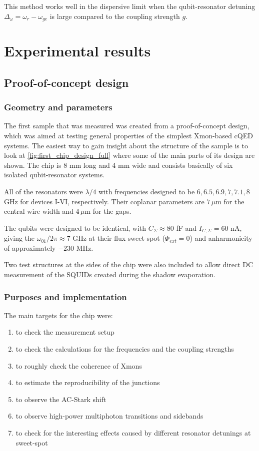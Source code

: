 \documentclass[12pt, twoside]{report}
\numberwithin{equation}{section}
\begin{document}
This method works well in the dispersive limit when the qubit-resonator detuning $\Delta_\omega = \omega_r - \omega_{ge}$ is large compared to the coupling strength $g$.

\chapter{Experimental results}

\section{Proof-of-concept design}

\subsection{Geometry and parameters}

The first sample that was measured was created from a proof-of-concept design, which was aimed at testing general properties of the simplest Xmon-based cQED systems. The easiest way to gain insight about the structure of the sample is to look at \autoref{fig:first_chip_design_full} where some of the main parts of its design are shown. The chip is 8 mm long and 4 mm wide and consists basically of six isolated qubit-resonator systems. 

All of the resonators were $\lambda/4$ with frequencies designed to be $6, 6.5, 6.9,7,7.1,8$ GHz for devices I-VI, respectively. Their coplanar parameters are $7\,\mu$m for the central wire width and $4\,\mu$m for the gaps.

The qubits were designed to be identical, with $C_\Sigma \approx 80$ fF and $I_{C, \Sigma} = 60$ nA, giving the $\omega_{01}/2\pi \approx 7$ GHz at their flux sweet-spot ($\Phi_{ext}=0$) and anharmonicity of approximately $-230$ MHz.

Two test structures at the sides of the chip were also included to allow direct DC measurement of the SQUIDs created during the shadow evaporation.

\subsection{Purposes and implementation}

The main targets for the chip were:
\begin{enumerate}[label=(\alph*), leftmargin=1.5cm]
\itemsep0pt
 \item to check the measurement setup
 \item to check the calculations for the frequencies and the coupling strengths
 \item to roughly check the coherence of Xmons
 \item to estimate the reproducibility of the junctions 
 \item to observe the AC-Stark shift 
 \item to observe high-power multiphoton transitions and sidebands
 \item to check for the interesting effects caused by different resonator detunings at sweet-spot  
\end{enumerate}
\end{document}
